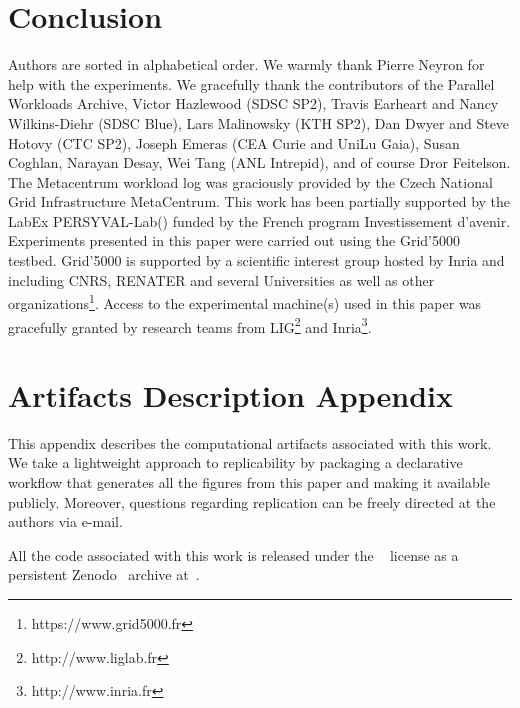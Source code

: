 \documentclass[sigconf]{acmart}
\begin{document}
\section{Conclusion}
\label{sec:ccl}

\begin{acks}

Authors are sorted in alphabetical order. We warmly thank Pierre Neyron for help with the experiments. We gracefully thank the contributors
of the Parallel Workloads Archive, Victor Hazlewood (SDSC SP2), Travis Earheart
and Nancy Wilkins-Diehr (SDSC Blue), Lars Malinowsky (KTH SP2), Dan Dwyer and
Steve Hotovy (CTC SP2), Joseph Emeras (CEA Curie and UniLu Gaia), Susan
Coghlan, Narayan Desay, Wei Tang (ANL Intrepid), and of course Dror Feitelson.
The Metacentrum workload log was graciously provided by the Czech National Grid
Infrastructure MetaCentrum. This work has been partially supported by the LabEx
PERSYVAL-Lab() funded by
the French program Investissement d'avenir. Experiments presented in this paper
were carried out using the Grid'5000 testbed. Grid'5000 is supported by a
scientific interest group hosted by Inria and including CNRS, RENATER and
several Universities as well as other
organizations\footnote{https://www.grid5000.fr}.  Access to the experimental
machine(s) used in this paper was gracefully granted by research teams from
LIG\footnote{http://www.liglab.fr} and Inria\footnote{http://www.inria.fr}.

\end{acks}




\clearpage

\section*{Artifacts Description Appendix}

This appendix describes the computational artifacts associated with this work. We
take a lightweight approach to replicability by packaging a declarative
workflow that generates all the figures from this paper and making it available
publicly. Moreover, questions regarding replication can be freely directed at
the authors via e-mail.

All the code associated with this work is released under the ~\cite{ISC}
license as a persistent Zenodo~\cite{zenodo} archive at~\cite{zenodomain}.
\end{document}
